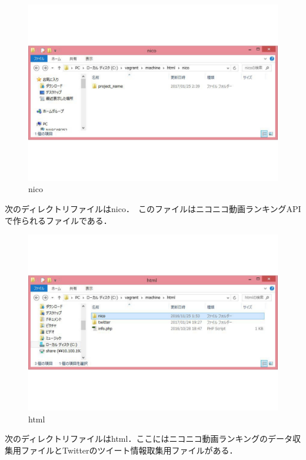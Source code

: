 \begin{figure}[htb]
\centering
\includegraphics[width=14cm]{fairu02.pdf}
\caption{nico}\label{ace}
\end{figure}


次のディレクトリファイルはnico．　このファイルはニコニコ動画ランキングAPIで作られるファイルである．

\clearpage


\begin{figure}[htb]
\centering
\includegraphics[width=14cm]{fairu03.pdf}
\caption{html}\label{ace}
\end{figure}



次のディレクトリファイルはhtml．ここにはニコニコ動画ランキングのデータ収集用ファイルとTwitterのツイート情報取集用ファイルがある．



